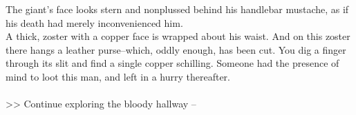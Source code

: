 The giant's face looks stern and nonplussed behind his handlebar mustache, as if his death had merely inconvenienced him.\\

A thick, zoster with a copper face is wrapped about his waist. And on this zoster there hangs a leather purse--which, oddly enough, has been cut. You dig a finger through its slit and find a single copper schilling. Someone had the presence of mind to loot this man, and left in a hurry thereafter.\\
\\

>> Continue exploring the bloody hallway -- 